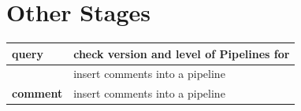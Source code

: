 \chapter{Other Stages}
\begin{tabularx}{\textwidth}{>{\bfseries}lX}
\toprule
query&check version and level of Pipelines for \nr{}
\\\midrule
\doublehyphen{}&insert comments into a pipeline
\\\midrule
comment&insert comments into a pipeline
\\\bottomrule
\end{tabularx}








